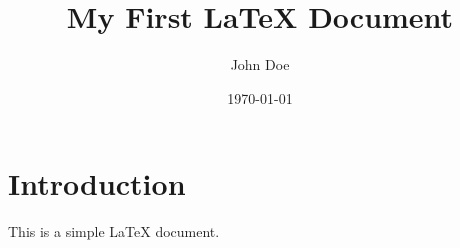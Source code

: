 \documentclass{article}
\begin{document}
\title{My First LaTeX Document}
\author{John Doe}
\date{\today}
\maketitle
\section{Introduction}
This is a simple LaTeX document.
\end{document}
